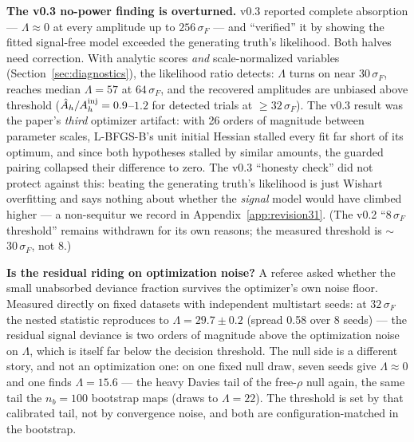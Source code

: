\documentclass[11pt]{article}
\newcommand{\Ah}{A_h}
\begin{document}
\textbf{The v0.3 no-power finding is overturned.} v0.3 reported complete absorption --- $\Lambda \approx 0$ at every amplitude up to $256\,\sigma_F$ --- and ``verified'' it by showing the fitted signal-free model exceeded the generating truth's likelihood. Both halves need correction. With analytic scores \emph{and} scale-normalized variables (Section~\ref{sec:diagnostics}), the likelihood ratio detects: $\Lambda$ turns on near $30\,\sigma_F$, reaches median $\Lambda = 57$ at $64\,\sigma_F$, and the recovered amplitudes are unbiased above threshold ($\hat\Ah/\Ah^{\rm inj} = 0.9$--$1.2$ for detected trials at $\ge 32\,\sigma_F$). The v0.3 result was the paper's \emph{third} optimizer artifact: with 26 orders of magnitude between parameter scales, L-BFGS-B's unit initial Hessian stalled every fit far short of its optimum, and since both hypotheses stalled by similar amounts, the guarded pairing collapsed their difference to zero. The v0.3 ``honesty check'' did not protect against this: beating the generating truth's likelihood is just Wishart overfitting and says nothing about whether the \emph{signal} model would have climbed higher --- a non-sequitur we record in Appendix~\ref{app:revision31}. (The v0.2 ``$8\,\sigma_F$ threshold'' remains withdrawn for its own reasons; the measured threshold is $\sim$$30\,\sigma_F$, not $8$.)

\textbf{Is the residual riding on optimization noise?} A referee asked whether the small unabsorbed deviance fraction survives the optimizer's own noise floor. Measured directly on fixed datasets with independent multistart seeds: at $32\,\sigma_F$ the nested statistic reproduces to $\Lambda = 29.7 \pm 0.2$ (spread 0.58 over 8 seeds) --- the residual signal deviance is two orders of magnitude above the optimization noise on $\Lambda$, which is itself far below the decision threshold. The null side is a different story, and not an optimization one: on one fixed null draw, seven seeds give $\Lambda \approx 0$ and one finds $\Lambda = 15.6$ --- the heavy Davies tail of the free-$\rho$ null again, the same tail the $n_b = 100$ bootstrap maps (draws to $\Lambda = 22$). The threshold is set by that calibrated tail, not by convergence noise, and both are configuration-matched in the bootstrap.
\end{document}
